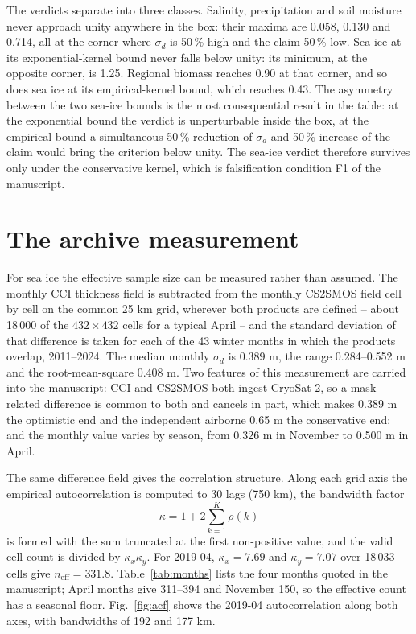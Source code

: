 \documentclass[preprint,12pt,authoryear]{elsarticle}
\begin{document}
The verdicts separate into three classes. Salinity, precipitation and soil moisture never approach unity anywhere in the box: their maxima are 0.058, 0.130 and 0.714, all at the corner where $\sigma_d$ is 50\,\% high and the claim 50\,\% low. Sea ice at its exponential-kernel bound never falls below unity: its minimum, at the opposite corner, is 1.25. Regional biomass reaches 0.90 at that corner, and so does sea ice at its empirical-kernel bound, which reaches 0.43. The asymmetry between the two sea-ice bounds is the most consequential result in the table: at the exponential bound the verdict is unperturbable inside the box, at the empirical bound a simultaneous 50\,\% reduction of $\sigma_d$ and 50\,\% increase of the claim would bring the criterion below unity. The sea-ice verdict therefore survives only under the conservative kernel, which is falsification condition F1 of the manuscript.

\section{The archive measurement}
\label{sec:s5}

For sea ice the effective sample size can be measured rather than assumed. The monthly CCI thickness field is subtracted from the monthly CS2SMOS field cell by cell on the common 25 km grid, wherever both products are defined -- about 18\,000 of the $432\times432$ cells for a typical April -- and the standard deviation of that difference is taken for each of the 43 winter months in which the products overlap, 2011--2024. The median monthly $\sigma_d$ is 0.389 m, the range 0.284--0.552 m and the root-mean-square 0.408 m. Two features of this measurement are carried into the manuscript: CCI and CS2SMOS both ingest CryoSat-2, so a mask-related difference is common to both and cancels in part, which makes 0.389 m the optimistic end and the independent airborne 0.65 m the conservative end; and the monthly value varies by season, from 0.326 m in November to 0.500 m in April.

The same difference field gives the correlation structure. Along each grid axis the empirical autocorrelation is computed to 30 lags (750 km), the bandwidth factor
\begin{equation}
\kappa = 1 + 2\sum_{k=1}^{K}\rho(k)
\label{eq:kappa}
\end{equation}
is formed with the sum truncated at the first non-positive value, and the valid cell count is divided by $\kappa_x\kappa_y$. For 2019-04, $\kappa_x = 7.69$ and $\kappa_y = 7.07$ over 18\,033 cells give $n_{\mathrm{eff}} = 331.8$. Table~\ref{tab:months} lists the four months quoted in the manuscript; April months give 311--394 and November 150, so the effective count has a seasonal floor. Fig.~\ref{fig:acf} shows the 2019-04 autocorrelation along both axes, with bandwidths of 192 and 177 km.
\end{document}
